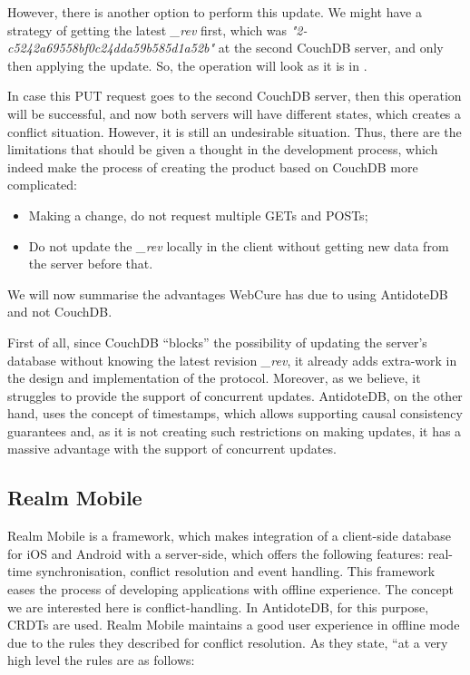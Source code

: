 However, there is another option to perform this update. We might have a strategy of getting the latest \textit{\_rev} first, which was \textit{"2-c5242a69558bf0c24dda59b585d1a52b"} at the second CouchDB server, and only then applying the update. So, the operation will look as it is in .

In case this PUT request goes to the second CouchDB server, then this operation will be successful, and now both servers will have different states, which creates a conflict situation. 
However, it is still an undesirable situation. Thus, there are the limitations that should be given a thought in the development process, which indeed make the process of creating the product based on CouchDB more complicated:
    \begin{itemize}
        \item {Making a change, do not request multiple GETs and POSTs;}
        \item {Do not update the \textit{\_rev} locally in the client without getting new data from the server before that.}
      \end{itemize}
      
We will now summarise the advantages WebCure has due to using AntidoteDB and not CouchDB. 

First of all, since CouchDB ``blocks'' the possibility of updating the server's database without knowing the latest revision \textit{\_rev}, it already adds extra-work in the design and implementation of the protocol. Moreover, as we believe, it struggles to provide the support of concurrent updates. AntidoteDB, on the other hand, uses the concept of timestamps, which allows supporting causal consistency guarantees and, as it is not creating such restrictions on making updates, it has a massive advantage with the support of concurrent updates. 

\subsection*{Realm Mobile}

Realm Mobile is a framework, which makes integration of a client-side database for iOS and Android with a server-side, which offers the following features: real-time synchronisation, conflict resolution and event handling. This framework eases the process of developing applications with offline experience. The concept we are interested here is conflict-handling. In AntidoteDB, for this purpose, CRDTs are used. Realm Mobile maintains a good user experience in offline mode due to the rules they described for conflict resolution.
As they state, ``at a very high level the rules are as follows:

